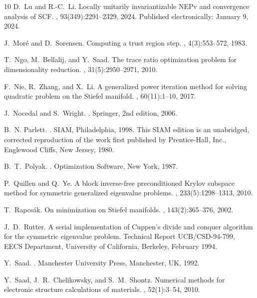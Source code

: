 \documentclass[11pt]{article}
\theoremstyle{definition}
\numberwithin{equation}{section}
\begin{document}
{\begin{thebibliography}{10}
D.~Lu and R.-C.~Li.
\newblock Locally unitarily invariantizable {NEP}v and convergence analysis of
  {SCF}.
, 93(349):2291--2329, 2024.
\newblock Published electronically: January 9, 2024.

J.~Mor{\' e} and D.~Sorensen.
\newblock Computing a trust region step.
, 4(3):553--572, 1983.

T.~Ngo, M.~Bellalij, and Y.~Saad.
\newblock The trace ratio optimization problem for dimensionality reduction.
, 31(5):2950--2971, 2010.

F.~Nie, R.~Zhang, and X.~Li.
\newblock A generalized power iteration method for solving quadratic problem on
  the {S}tiefel manifold.
, 60(11):1--10, 2017.

J.~Nocedal and S.~Wright.
.
\newblock Springer, 2nd edition, 2006.

B.~N. Parlett.
.
\newblock SIAM, Philadelphia, 1998.
\newblock This SIAM edition is an unabridged, corrected reproduction of the
  work first published by Prentice-Hall, Inc., Englewood Cliffs, New Jersey,
  1980.

B.~T.~Polyak.
.
\newblock Optimization Software, New York, 1987.

P.~Quillen and Q.~Ye.
\newblock A block inverse-free preconditioned {Krylov} subspace method for
  symmetric generalized eigenvalue problems.
, 233(5):1298--1313, 2010.

T.~Rapcs{\' a}k.
\newblock On minimization on {Stiefel} manifolds.
, 143(2):365--376, 2002.

J.~D.~Rutter.
\newblock A serial implementation of {C}uppen's divide and conquer algorithm
  for the symmetric eigenvalue problem.
\newblock Technical Report UCB/CSD-94-799, EECS Department, University of
  California, Berkeley, February 1994.

Y.~Saad.
.
\newblock Manchester University Press, Manchester, UK, 1992.

Y.~Saad, J.~R.~Chelikowsky, and S.~M.~Shontz.
\newblock Numerical methods for electronic structure calculations of materials.
, 52(1):3--54, 2010.


\end{thebibliography}}
\end{document}
